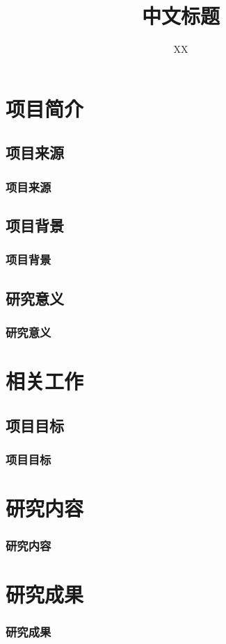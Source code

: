 \documentclass[aspectratio=169,12pt]{beamer}
\title{中文标题}
\author{XX}
\begin{document}
\maketitle
\makecontent

\section{项目简介}

\subsection{项目来源}
\begin{frame}
	\frametitle{项目来源}
\end{frame}

\subsection{项目背景}
\begin{frame}
	\frametitle{项目背景}
\end{frame}

\subsection{研究意义}
\begin{frame}
	\frametitle{研究意义}
\end{frame}

\section{相关工作}
\subsection{项目目标}
\begin{frame}
	\frametitle{项目目标}
\end{frame}

\section{研究内容}
\begin{frame}
	\frametitle{研究内容}
\end{frame}

\section{研究成果}
\begin{frame}
	\frametitle{研究成果}
\end{frame}
\end{document}
